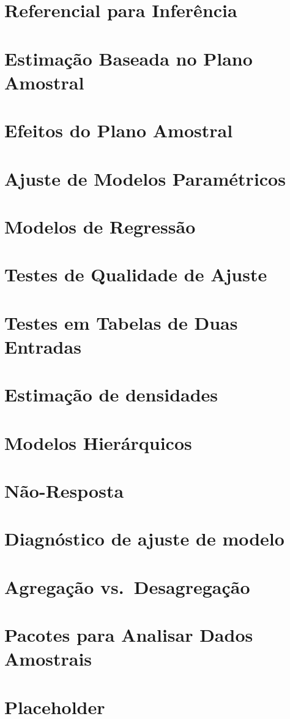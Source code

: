 \documentclass[]{book}
\numberwithin{example}{chapter}
\numberwithin{remark}{chapter}
\numberwithin{definition}{chapter}
\begin{document}
\chapter{Referencial para Inferência}\label{refinf}

\chapter{Estimação Baseada no Plano Amostral}\label{capplanamo}

\chapter{Efeitos do Plano Amostral}\label{epa}

\chapter{Ajuste de Modelos Paramétricos}\label{ajmodpar}

\chapter{Modelos de Regressão}\label{modreg}

\chapter{Testes de Qualidade de Ajuste}\label{testqualajust}

\chapter{Testes em Tabelas de Duas Entradas}\label{testetab2}

\chapter{Estimação de densidades}\label{estimacao-de-densidades}

\chapter{Modelos Hierárquicos}\label{modelos-hierarquicos}

\chapter{Não-Resposta}\label{nao-resposta}

\chapter{Diagnóstico de ajuste de
modelo}\label{diagnostico-de-ajuste-de-modelo}

\chapter{Agregação vs.~Desagregação}\label{agregdesag}

\chapter{Pacotes para Analisar Dados Amostrais}\label{pacotes}

\chapter{Placeholder}\label{placeholder}


\end{document}
